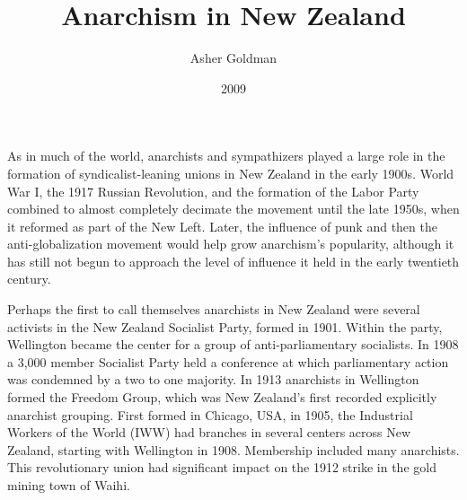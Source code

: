 \documentclass[DIV=12,%
               BCOR=10mm,%
               headinclude=false,%
               footinclude=false,open=any,%
               fontsize=11pt,%
               twoside,%
               paper=210mm:11in]%
               {scrbook}
\title{Anarchism in New Zealand}
\date{2009}
\author{Asher Goldman}
\subtitle{}
\begin{document}
     
     \cleardoublepage



\tableofcontents

\cleardoublepage




As in much of the world, anarchists and sympathizers played a large role in the formation of syndicalist-leaning unions in New Zealand in the early 1900s. World War I, the 1917 Russian Revolution, and the formation of the Labor Party combined to almost completely decimate the movement until the late 1950s, when it reformed as part of the New Left. Later, the influence of punk and then the anti-globalization movement would help grow anarchism’s popularity, although it has still not begun to approach the level of influence it held in the early twentieth century.


Perhaps the first to call themselves anarchists in New Zealand were several activists in the New Zealand Socialist Party, formed in 1901. Within the party, Wellington became the center for a group of anti-parliamentary socialists. In 1908 a 3,000 member Socialist Party held a conference at which parliamentary action was condemned by a two to one majority. In 1913 anarchists in Wellington formed the Freedom Group, which was New Zealand’s first recorded explicitly anarchist grouping. First formed in Chicago, USA, in 1905, the Industrial Workers of the World (IWW) had branches in several centers across New Zealand, starting with Wellington in 1908. Membership included many anarchists. This revolutionary union had significant impact on the 1912 strike in the gold mining town of Waihi.
\end{document}

